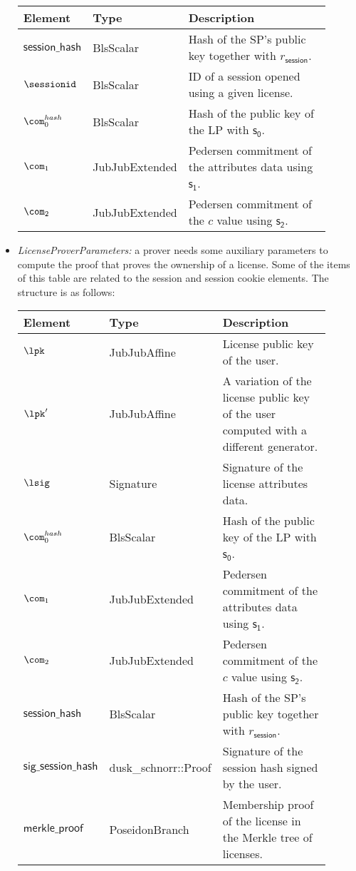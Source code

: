 \begin{itemize}
	\vspace{0.1cm}
	\begin{center}
		\begin{tabular}{ | p{0.15\linewidth} | p{0.2\linewidth} | p{0.55\linewidth} | } 
			\hline
			{Element} & {Type} & {Description} \\
			\hline
			$\mathsf{session\_hash}$ & BlsScalar & Hash of the SP's public key together with $r_\mathsf{session}$. \\ 
			$\sessionid$ & BlsScalar & ID of a session opened using a given license. \\ 
			$\com_0^{hash}$ & BlsScalar & Hash of the public key of the LP with $\mathsf{s_0}$. \\ 
			$\com_1$ & JubJubExtended & Pedersen commitment of the attributes data using $\mathsf{s_1}$. \\ 
			$\com_2$ & JubJubExtended & Pedersen commitment of the $c$ value using $\mathsf{s_2}$. \\ 
			\hline
		\end{tabular}
	\end{center}
	
    \item \emph{LicenseProverParameters:} a prover needs some auxiliary parameters to compute the proof that proves the ownership of a license. Some of the items of this table are related to the session and session cookie elements. The structure is as follows:

	\vspace{0.1cm}
	\begin{center}
		\begin{tabular}{ | p{0.15\linewidth} | p{0.2\linewidth} | p{0.55\linewidth} | } 
			\hline
			{Element} & {Type} & {Description} \\
			\hline
			$\lpk$ & JubJubAffine & License public key of the user.\\ 
			$\lpk'$ & JubJubAffine & A variation of the license public key of the user computed with a different generator.\\ 
			$\lsig$ & Signature & Signature of the license attributes data. \\ 
			$\com_0^{hash}$ & BlsScalar & Hash of the public key of the LP with $\mathsf{s_0}$. \\ 
			$\com_1$ & JubJubExtended & Pedersen commitment of the attributes data using $\mathsf{s_1}$. \\ 
			$\com_2$ & JubJubExtended & Pedersen commitment of the $c$ value using $\mathsf{s_2}$. \\ 
			$\mathsf{session\_hash}$ & BlsScalar & Hash of the SP's public key together with $r_\mathsf{session}$. \\ 
			$\mathsf{sig\_session\_hash}$ & dusk\_schnorr::Proof & Signature of the session hash signed by the user. \\ 
			$\mathsf{merkle\_proof}$ & PoseidonBranch & Membership proof of the license in the Merkle tree of licenses. \\ 
			
			\hline
		\end{tabular}
	\end{center}
		
\end{itemize}
